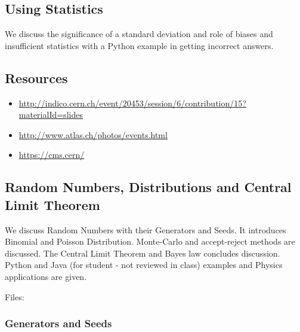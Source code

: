 
\subsection{Using Statistics}

We discuss the significance of a standard deviation and role of biases
and insufficient statistics with a Python example in getting incorrect
answers.


\subsection{Resources}

\begin{itemize}

\item
  \url{http://indico.cern.ch/event/20453/session/6/contribution/15?materialId=slides}
\item
  \url{http://www.atlas.ch/photos/events.html}
\item
  \url{https://cms.cern/}
\end{itemize}

\subsection{Random Numbers, Distributions and Central Limit Theorem}

We discuss Random Numbers with their Generators and Seeds. It introduces
Binomial and Poisson Distribution. Monte-Carlo and accept-reject methods
are discussed. The Central Limit Theorem and Bayes law concludes
discussion. Python and Java (for student - not reviewed in class)
examples and Physics applications are given.


Files:


\subsubsection{Generators and Seeds}

